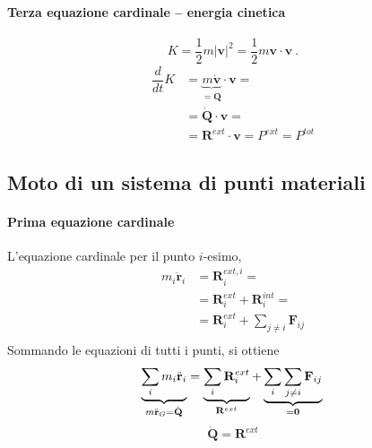\paragraph{Terza equazione cardinale -- energia cinetica}

\begin{equation} K = \dfrac{1}{2} m |\mathbf{v}|^2 = \dfrac{1}{2} m \mathbf{v} \cdot \mathbf{v} \ .
\end{equation}
\begin{equation}
\begin{aligned}
    \dfrac{d}{dt} K & = \underbrace{m \dot{\mathbf{v}}}_{=\dot{\mathbf{Q}}} \cdot \mathbf{v} = \\
    & = \dot{\mathbf{Q}} \cdot \mathbf{v} = \\
    & = \mathbf{R}^{ext} \cdot \mathbf{v} = P^{ext} = P^{tot}
\end{aligned}
\end{equation}

\subsection{Moto di un sistema di punti materiali}
\paragraph{Prima equazione cardinale}
L'equazione cardinale per il punto $i$-esimo,
\begin{equation}
\begin{aligned}
    m_i \ddot{\mathbf{r}}_i & = \mathbf{R}^{ext,i}_i = \\
    & = \mathbf{R}^{ext}_i + \mathbf{R}^{int}_i = \\
    & = \mathbf{R}^{ext}_i + \sum_{j \ne i} \mathbf{F}_{ij} \\
\end{aligned}
\end{equation}
Sommando le equazioni di tutti i punti, si ottiene
\begin{equation}
    \underbrace{\sum_{i} m_i \ddot{\mathbf{r}}_i}_{m \ddot{\mathbf{r}}_G = \dot{\mathbf{Q}} } = \underbrace{\sum_{i} \mathbf{R}^{ext}_i}_{\mathbf{R}^{ext}} + \underbrace{\sum_{i} \sum_{j \ne i} \mathbf{F}_{ij}}_{=\mathbf{0}} \\
\end{equation}
\begin{equation}
    \dot{\mathbf{Q}} = \mathbf{R}^{ext} 
\end{equation}

